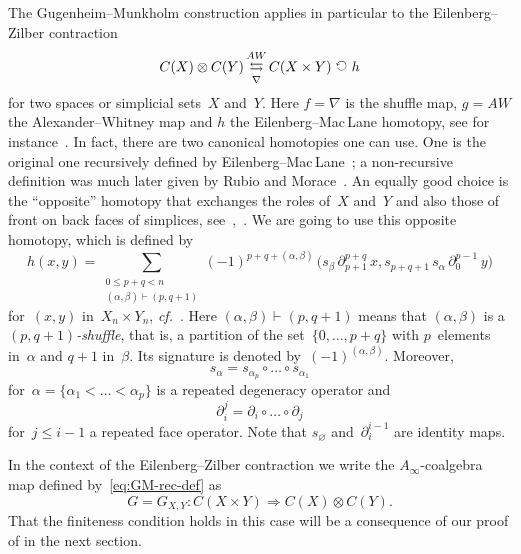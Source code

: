 \documentclass[letterpaper]{amsart}
\numberwithin{equation}{section}
\theoremstyle{plain}
\theoremstyle{definition}
\theoremstyle{remark}
\let\newterm\emph
\def\cf{\emph{cf.}}
\let\emptyset\varnothing
\def\Ainf{A_{\infty}}
\let\shuffle\nabla
\def\AW{AW}
\def\selfmapright{\mathbin{\rotatebox{90}{$\circlearrowleft$}}}
\begin{document}
The Gugenheim--Munkholm construction applies in particular to the Eilenberg--Zilber contraction
\begin{equation}
  \label{eq:ez-contraction}
  C(X)\otimes C(Y) \mathop{\leftrightarrows}^{\AW}_{\shuffle} C(X\times Y) \, \selfmapright \, h
\end{equation}
for two spaces or simplicial sets~$X$ and~$Y$.
Here $f=\shuffle$ is the shuffle map, $g=\AW$ the Alexander--Whitney map and $h$ the Eilenberg--Mac\,Lane homotopy,
see for instance~\cite[Sec.~3]{Franz:szczarba1}.
In fact, there are two canonical homotopies one can use. One is the original one
recursively defined by Eilenberg--Mac\,Lane~\cite[eqs.~(2.13)]{EilenbergMacLane:1954};
a non-recursive definition was much later given by Rubio and Morace~\cite[Sec.~3.1]{Rubio:1991}.
An equally good choice is the ``opposite'' homotopy
that exchanges the roles of~$X$ and~$Y$ and also those of front on back faces of simplices,
see~\cite[Sec.~3.3]{Rubio:1991},~\cite[Sec.~4]{Franz:szczarba1}.
We are going to use this opposite homotopy, which is defined by
\begin{equation}
  \label{eq:def-h}
  h(x,y) = \!\!\! \sum_{\substack{0\le p+q < n\\(\alpha,\beta)\vdash(p,q+1)}} \!\!\! (-1)^{p+q+(\alpha,\beta)}\,
  \bigl(s_{\beta}\,\partial_{p+1}^{p+q}\,x, s_{p+q+1}\,s_{\alpha}\,\partial_{0}^{p-1}\,y\bigr)
\end{equation}
for~$(x,y)$ in~$X_{n}\times Y_{n}$, \cf~\cite[eq.~(4.8)]{Franz:szczarba1}.
Here $(\alpha,\beta)\vdash(p,q+1)$ means that $(\alpha,\beta)$ is a \newterm{$(p,q+1)$-shuffle}, that is,
a partition of the set~$\{0,\dots,p+q\}$ with $p$~elements in~$\alpha$ and $q+1$ in~$\beta$.
Its signature is denoted by~$(-1)^{(\alpha,\beta)}$.
Moreover,
\begin{equation}
  s_{\alpha} = s_{\alpha_{p}} \circ \dots \circ s_{\alpha_{1}}
\end{equation}
for~$\alpha=\{\alpha_{1}<\dots<\alpha_{p}\}$ is a repeated degeneracy operator and
\begin{equation}
  \partial_{i}^{j} = \partial_{i} \circ \dots \circ \partial_{j}
\end{equation}
for~$j\le i-1$ a repeated face operator. Note that $s_{\emptyset}$ and~$\partial_{i}^{i-1}$ are identity maps.

In the context of the Eilenberg--Zilber contraction
we write the $\Ainf$-coalgebra map defined by~\eqref{eq:GM-rec-def} as
\begin{equation}
  \label{eq:GM-XY}
  G = G_{X,Y}\colon C(X\times Y) \Rightarrow C(X)\otimes C(Y).
\end{equation}
That the finiteness condition holds in this case will be a consequence
of our proof of  in the next section.
\end{document}
